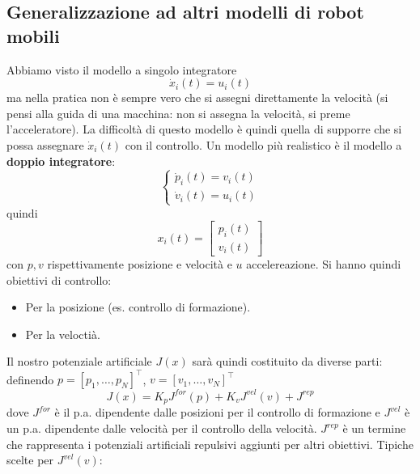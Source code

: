 \subsection{Generalizzazione ad altri modelli di robot mobili}
Abbiamo visto il modello a singolo integratore
\begin{equation}
\dot{x}_i(t) = u_i(t)
\end{equation}
ma nella pratica non \`e sempre vero che si assegni direttamente la velocit\`a (si pensi alla guida di una macchina: non si assegna la velocit\`a, si preme l'acceleratore). La difficolt\`a di questo modello \`e quindi quella di supporre che si possa assegnare $\dot{x}_i(t)$ con il controllo. Un modello pi\`u realistico \`e il modello a \textbf{doppio integratore}:
\begin{equation}
\begin{cases}
\dot{p}_i(t) = v_i(t) \\
\dot{v}_i(t) = u_i(t)
\end{cases}
\end{equation} quindi
\begin{equation}
x_i(t) = \begin{bmatrix}
p_i(t) \\
v_i(t)
\end{bmatrix}
\end{equation} con $p,v$ rispettivamente posizione e velocit\`a e $u$ accelereazione.
Si hanno quindi obiettivi di controllo:
\begin{itemize}
\item Per la posizione (es. controllo di formazione).
\item Per la velocti\`a.
\end{itemize}
Il nostro potenziale artificiale $J(x)$ sar\`a quindi costituito da diverse parti: definendo $p = [p_1, \dots, p_N]^\intercal $, $v = [v_1, \dots, v_N]^\intercal $
\begin{equation}
J(x) = K_pJ^{for}(p) + K_v J^{vel}(v) + J^{rep}
\end{equation} dove $J^{for}$ \`e il p.a. dipendente dalle posizioni per il controllo di formazione e $J^{vel}$ \`e un p.a. dipendente dalle velocit\`a per il controllo della velocit\`a. $J^{rep}$ \`e un termine che rappresenta i potenziali artificiali repulsivi aggiunti per altri obiettivi.
Tipiche scelte per $J^{vel}(v)$:
